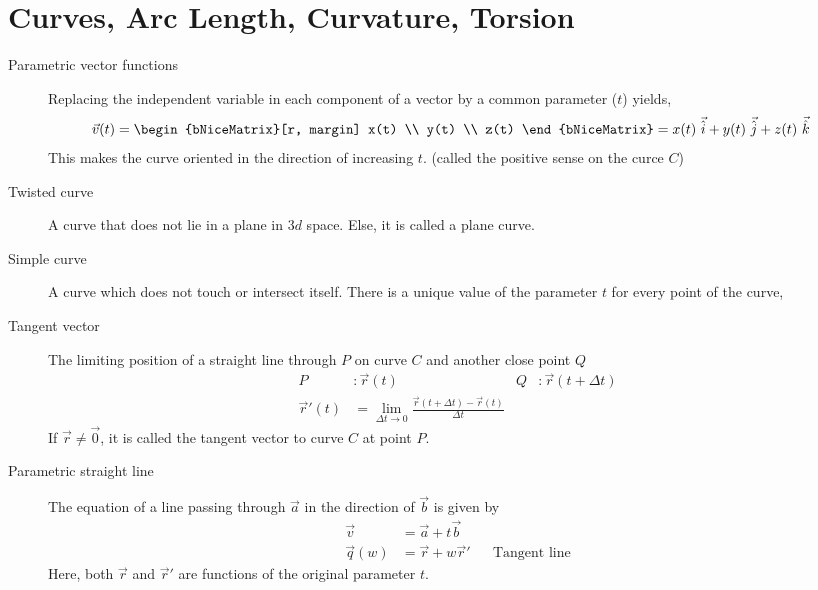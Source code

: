 \section{Curves, Arc Length, Curvature, Torsion}

\begin{description}
    \item[Parametric vector functions] Replacing the independent variable in each
          component of a vector by a common parameter ($ t $) yields,
          \begin{align}
              \vec{v}(t) & =
              \begin{bNiceMatrix}[r, margin]
                  x(t) \\ y(t) \\ z(t)
              \end{bNiceMatrix}
              = x(t)\ \vec{\hat{i}} + y(t)\ \vec{\hat{j}} + z(t)\ \vec{\hat{k}}
          \end{align}
          This makes the curve oriented in the direction of increasing $ t $. (called the
          positive sense on the curce $ C $)

    \item[Twisted curve] A curve that does not lie in a plane in $ 3d $ space. Else, it
          is called a plane curve.

    \item[Simple curve] A curve which does not touch or intersect itself. There is a
          unique value of the parameter $ t $ for every point of the curve,

    \item[Tangent vector] The limiting position of a straight line through $ P $ on
          curve $ C $ and another close point $ Q $
          \begin{align}
              P           & : \vec{r}(t)            &
              Q           & : \vec{r}(t + \Delta t)   \\
              \vec{r}'(t) & = \lim_{\Delta t \to 0}
              \frac{\vec{r}(t + \Delta t) - \vec{r}(t)}{\Delta t}
          \end{align}
          If $ \vec{r} \neq \vec{0} $, it is called the tangent vector to curve $ C $ at
          point $ P $.

    \item[Parametric straight line] The equation of a line passing through $ \vec{a} $
          in the direction of $ \vec{b} $ is given by
          \begin{align}
              \vec{v}    & = \vec{a} + t\vec{b}                           \\
              \vec{q}(w) & = \vec{r} + w\vec{r}' &  & \text{Tangent line}
          \end{align}
          Here, both $ \vec{r} $ and $ \vec{r}' $ are functions of the original parameter
          $ t $.


\end{description}
